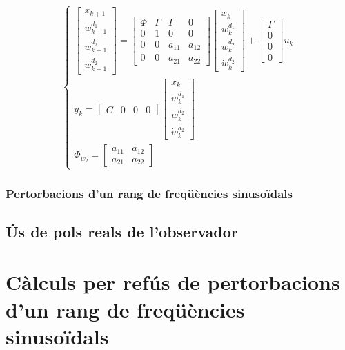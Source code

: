 \documentclass[12pt,a4paper,final,twoside,openright]{report}
\begin{document}
\begin{equation}\label{eq:pert_const_model_mat}
\left\{
\begin{array}{lr}
\begin{bmatrix}
x_{k+1}\\
w_{k+1}^{d_1}\\
w_{k+1}^{d_2}\\
\dot{w}_{k+1}^{d_2}
\end{bmatrix} = 
\begin{bmatrix}
\Phi & \Gamma & \Gamma & 0\\
0 & 1 & 0 & 0\\
0 & 0 & a_{11} & a_{12}\\
0 & 0 & a_{21} & a_{22}
\end{bmatrix} \begin{bmatrix}
x_{k}\\
w_k^{d_1}\\
w_k^{d_2}\\
\dot{w}_k^{d_2}
\end{bmatrix} + 
\begin{bmatrix}
\Gamma\\
0\\
0\\
0
\end{bmatrix} u_k\\

y_k=\begin{bmatrix}
C & 0 & 0 & 0
\end{bmatrix} \begin{bmatrix}
x_{k}\\
w_k^{d_1}\\
w_k^{d_2}\\
\dot{w}_k^{d_2}
\end{bmatrix}\\

\Phi_{w_2}=\begin{bmatrix}
a_{11} & a_{12}\\
a_{21} & a_{22}
\end{bmatrix}

\end{array}
\right.
\end{equation}

\subsection{Pertorbacions d'un rang de freqüències sinusoïdals}
\label{sec:pert_rang_sin}

\section{Ús de pols reals de l'observador}

%


\appendix
\clearpage %
\addappheadtotoc
\appendixpage

\chapter{Càlculs per refús de pertorbacions d'un rang de freqüències sinusoïdals}
\end{document}
